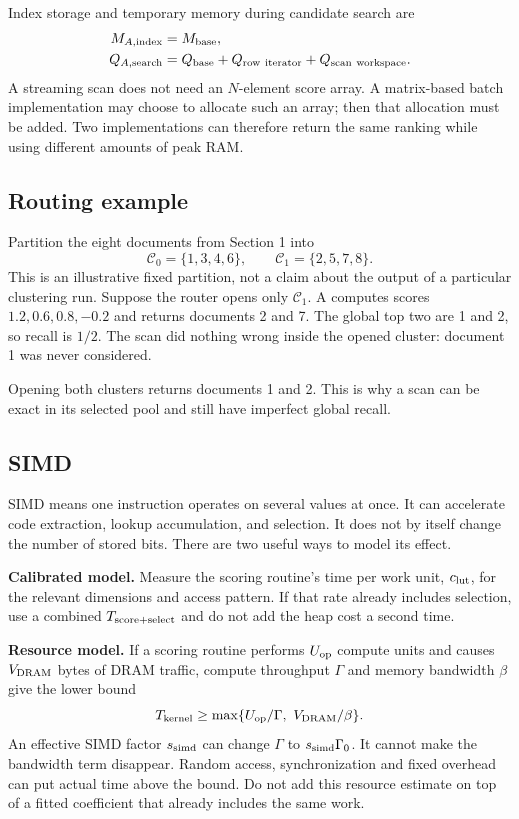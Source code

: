 Index storage and temporary memory during candidate search are
\begin{align}
M_{A,\rm index}&=\Mbase,\\
Q_{A,\rm search}&=\Qbase+Q_{\rm row\ iterator}+Q_{\rm scan\ workspace}.
\label{eq:scan-memory}
\end{align}
A streaming scan does not need an $N$-element score array. A matrix-based batch implementation
may choose to allocate such an array; then that allocation must be added. Two implementations can therefore return the same ranking while using different amounts of
peak RAM.

\subsection{Routing example}
Partition the eight documents from Section 1 into
\[
\mathcal C_0=\{1,3,4,6\},\qquad \mathcal C_1=\{2,5,7,8\}.
\]
This is an illustrative fixed partition, not a claim about the output of a particular
clustering run. Suppose the router opens only $\mathcal C_1$. A computes scores
$1.2,0.6,0.8,-0.2$ and returns documents 2 and 7. The global top two are 1 and 2, so recall is
$1/2$. The scan did nothing wrong inside the opened cluster: document 1 was never considered.

Opening both clusters returns documents 1 and 2. This is why a scan can be exact in its selected
pool and still have imperfect global recall.

\subsection{SIMD}
SIMD means one instruction operates on several values at once. It can accelerate code extraction,
lookup accumulation, and selection. It does not by itself change the number of stored bits.
There are two useful ways to model its effect.

\textbf{Calibrated model.} Measure the scoring routine's time per work unit,
$c_{\rm lut}$, for the relevant dimensions and access pattern. If that rate already includes
selection, use a combined $T_{\rm score+select}$ and do not add the heap cost a second time.

\textbf{Resource model.} If a scoring routine performs $U_{\rm op}$ compute units and causes $V_{\rm DRAM}$ bytes of DRAM
traffic, compute throughput $\Gamma$ and memory bandwidth $\beta$ give the lower bound
\begin{equation}
T_{\rm kernel}\geq\max\{U_{\rm op}/\Gamma,\ V_{\rm DRAM}/\beta\}.
\label{eq:resource}
\end{equation}
An effective SIMD factor $s_{\rm simd}$ can change $\Gamma$ to $s_{\rm simd}\Gamma_0$.
It cannot make the bandwidth term disappear. Random access, synchronization and fixed overhead
can put actual time above the bound. Do not add this resource estimate on top of a fitted
coefficient that already includes the same work.

